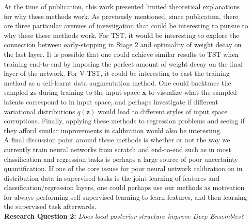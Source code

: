 \noindent At the time of publication, this work presented limited theoretical explanations for why these methods work. As previously mentioned, since publication, there are three particular avenues of investigation that could be interesting to pursue to why these these methods work. For TST, it would be interesting to explore the connection between early-stopping in Stage 2 and optimality of weight decay on the last layer. It is possible that one could achieve similar results to TST when training end-to-end by imposing the perfect amount of weight decay on the final layer of the network. For V-TST, it could be interesting to cast the training method as a self-learnt data augmentation method. One could backtrace the sampled $\mathbf{z}$s during training to the input space $\mathbf{x}$ to visualize what the sampled latents correspond to in input space, and perhaps investigate if different variational distributions 
$q(\mathbf{z})$ would lead to different styles of input space corruptions. Finally, applying these methods to regression problems and seeing if they afford similar improvements in calibration would also be interesting. \\

\noindent A final discussion point around these methods is whether or not the way we currently train neural networks from scratch and end-to-end such as in most classification and regression tasks is perhaps a large source of poor uncertainty quantification. If one of the core issues for poor neural network calibration on in distribution data in supervised tasks is the joint learning of features and classification/regression layers, one could perhaps use our methods as motivation for always performing self-supervised learning to learn features, and then learning the supervised task afterwards.  \\

  \noindent \textbf{Research Question 2:} \textit{Does local posterior structure improve Deep Ensembles?} \\

